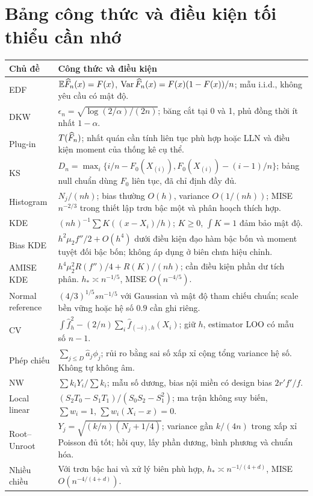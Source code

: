 \section{Bảng công thức và điều kiện tối thiểu cần nhớ}
\begin{longtable}{p{}p{}}
\toprule Chủ đề & Công thức và điều kiện\\\midrule\endhead
EDF & $\mathbb E\widehat F_n(x)=F(x)$, $\operatorname{Var}\widehat F_n(x)=F(x)(1-F(x))/n$;
mẫu i.i.d., không yêu cầu có mật độ.\\[4pt]
DKW & $\epsilon_n=\sqrt{\log(2/\alpha)/(2n)}$; băng cắt tại 0 và 1,
phủ đồng thời ít nhất $1-\alpha$.\\[4pt]
Plug-in & $T(\widehat F_n)$; nhất quán cần tính liên tục phù hợp hoặc LLN
và điều kiện moment của thống kê cụ thể.\\[4pt]
KS & $D_n=\max_i\{i/n-F_0(X_{(i)}),F_0(X_{(i)})-(i-1)/n\}$;
bảng null chuẩn dùng $F_0$ liên tục, đã chỉ định đầy đủ.\\[4pt]
Histogram & $N_j/(nh)$; bias thường $O(h)$, variance $O(1/(nh))$;
MISE $n^{-2/3}$ trong thiết lập trơn bậc một và phân hoạch thích hợp.\\[4pt]
KDE & $(nh)^{-1}\sum K((x-X_i)/h)$; $K\geq0$, $\int K=1$
đảm bảo mật độ.\\[4pt]
Bias KDE & $h^2\mu_2f''/2+O(h^4)$ dưới điều kiện đạo hàm bậc bốn
và moment tuyệt đối bậc bốn; không áp dụng ở biên chưa hiệu chỉnh.\\[4pt]
AMISE KDE & $h^4\mu_2^2R(f'')/4+R(K)/(nh)$;
cần điều kiện phần dư tích phân. $h_*\asymp n^{-1/5}$,
MISE $O(n^{-4/5})$.\\[4pt]
Normal reference & $(4/3)^{1/5}s n^{-1/5}$ với Gaussian và mật độ
tham chiếu chuẩn; scale bền vững hoặc hệ số $0.9$ cần ghi riêng.\\[4pt]
CV & $\int\widehat f_h^2-(2/n)\sum_i\widehat f_{(-i),h}(X_i)$;
giữ $h$, estimator LOO có mẫu số $n-1$.\\[4pt]
Phép chiếu & $\sum_{j\leq D}\widehat a_j\phi_j$;
rủi ro bằng sai số xấp xỉ cộng tổng variance hệ số. Không tự không âm.\\[4pt]
NW & $\sum k_iY_i/\sum k_i$; mẫu số dương, bias nội miền có
design bias $2r'f'/f$.\\[4pt]
Local linear & $(S_2T_0-S_1T_1)/(S_0S_2-S_1^2)$;
ma trận không suy biến, $\sum w_i=1$, $\sum w_i(X_i-x)=0$.\\[4pt]
Root--Unroot & $Y_j=\sqrt{(k/n)(N_j+1/4)}$;
variance gần $k/(4n)$ trong xấp xỉ Poisson đủ tốt;
hồi quy, lấy phần dương, bình phương và chuẩn hóa.\\[4pt]
Nhiều chiều & Với trơn bậc hai và xử lý biên phù hợp,
$h_*\asymp n^{-1/(4+d)}$, MISE $O(n^{-4/(4+d)})$.\\
\bottomrule
\end{longtable}

